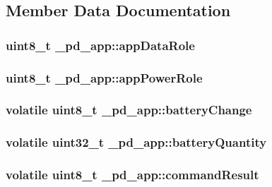 \subsection{Member Data Documentation}
\hypertarget{struct__pd__app_a178e5ae073da9205e29d5b25fd47f0e0}{
\subsubsection[{app\-Data\-Role}]{\setlength{\rightskip}{0pt plus 5cm}uint8\-\_\-t \-\_\-pd\-\_\-app\-::app\-Data\-Role}}\label{struct__pd__app_a178e5ae073da9205e29d5b25fd47f0e0}
\hypertarget{struct__pd__app_ad2ef322a1e0c25a898d7aeef4242eae8}{
\subsubsection[{app\-Power\-Role}]{\setlength{\rightskip}{0pt plus 5cm}uint8\-\_\-t \-\_\-pd\-\_\-app\-::app\-Power\-Role}}\label{struct__pd__app_ad2ef322a1e0c25a898d7aeef4242eae8}
\hypertarget{struct__pd__app_a588a6313718bb3ee5f8bb272d420824c}{
\subsubsection[{battery\-Change}]{\setlength{\rightskip}{0pt plus 5cm}volatile uint8\-\_\-t \-\_\-pd\-\_\-app\-::battery\-Change}}\label{struct__pd__app_a588a6313718bb3ee5f8bb272d420824c}
\hypertarget{struct__pd__app_a0c2c01fcb1b30a9b27dbb8ea83d7647b}{
\subsubsection[{battery\-Quantity}]{\setlength{\rightskip}{0pt plus 5cm}volatile uint32\-\_\-t \-\_\-pd\-\_\-app\-::battery\-Quantity}}\label{struct__pd__app_a0c2c01fcb1b30a9b27dbb8ea83d7647b}
\hypertarget{struct__pd__app_aad9f6262f331cbc8c594dada122c31dd}{
\subsubsection[{command\-Result}]{\setlength{\rightskip}{0pt plus 5cm}volatile uint8\-\_\-t \-\_\-pd\-\_\-app\-::command\-Result}}\label{struct__pd__app_aad9f6262f331cbc8c594dada122c31dd}
